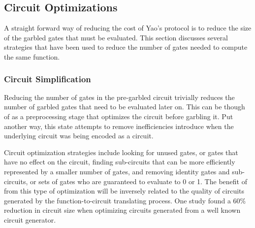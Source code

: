 
\subsection{Circuit Optimizations}

A straight forward way of reducing the cost of Yao's protocol is to reduce the size of the garbled gates that must be evaluated. This section discusses several strategies that have been used to reduce the number of gates needed to compute the same function.

\subsubsection{Circuit Simplification}

Reducing the number of gates in the pre-garbled circuit trivially reduces the number of garbled gates that need to be evaluated later on.  This can be though of as a preprocessing stage that optimizes the circuit before garbling it.  Put another way, this state attempts to remove inefficiencies introduce when the underlying circuit was being encoded as a circuit.

Circuit optimization strategies include looking for unused gates, or gates that have no effect on the circuit, finding sub-circuits that can be more efficiently represented by a smaller number of gates, and removing identity gates and sub-circuits, or sets of gates who are guaranteed to evaluate to 0 or 1\cite{kreuter2012billion, pinkas2009secure}.  The benefit of from this type of optimization will be inversely related to the quality of circuits generated by the function-to-circuit translating process.  One study\cite{pinkas2009secure} found a 60\% reduction in circuit size when optimizing circuits generated from a well known circuit generator\cite{malkhi2004fairplay}.


